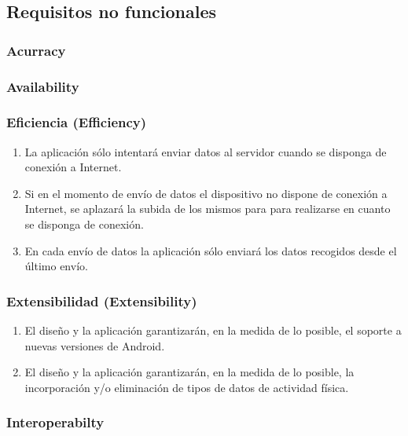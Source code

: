     
    \subsection{Requisitos no funcionales}
        \label{req:especificos:no_funcionales}
        \subsubsection{Acurracy}
        \subsubsection{Availability}
        \subsubsection{Eficiencia (Efficiency)}
            \begin{enumerate}[label=\textbf{\texttt{RNF-\arabic*}}]
                \item La aplicación sólo intentará enviar datos al servidor cuando se disponga de conexión a Internet.
                \item Si en el momento de envío de datos el dispositivo no dispone de conexión a Internet, se aplazará la subida de los mismos para para realizarse en cuanto se disponga de conexión.
                \item En cada envío de datos la aplicación sólo enviará los datos recogidos desde el último envío.
            \end{enumerate}
        \subsubsection{Extensibilidad (Extensibility)}
            \begin{enumerate}[resume, label=\textbf{\texttt{RNF-\arabic*}}]
                \item El diseño y la aplicación garantizarán, en la medida de lo posible, el soporte a nuevas versiones de Android.
                \item El diseño y la aplicación garantizarán, en la medida de lo posible, la incorporación y/o eliminación de tipos de datos de actividad física.
            \end{enumerate}
        \subsubsection{Interoperabilty}
